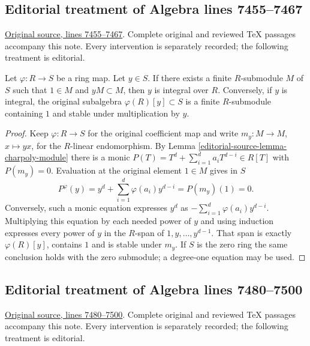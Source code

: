 \subsection{Editorial treatment of Algebra lines 7455--7467}

\hypertarget{algebra-context-069}{}

\noindent\href{https://github.com/stacks/stacks-project/blob/a04446e57ec1fbc252a871afcec7752fb2807b14/algebra.tex\#L7455}{Original source, lines 7455--7467}. Complete original and reviewed TeX passages accompany this note. Every intervention is separately recorded; the following treatment is editorial.


\begin{lemma}
\label{editorial-source-lemma-characterize-integral-element}
Let $\varphi : R \to S$ be a ring map. Let $y \in S$. If there exists a
finite $R$-submodule $M$ of $S$ such that $1 \in M$ and $yM \subset M$,
then $y$ is integral over $R$.
Conversely, if $y$ is integral, the original subalgebra
$\varphi(R)[y]\subset S$ is a finite $R$-submodule containing $1$
and stable under multiplication by $y$.
\end{lemma}

\begin{proof}
Keep $\varphi:R\to S$ for the original coefficient map and write
$m_y:M\to M$, $x\mapsto yx$, for the $R$-linear endomorphism.
By Lemma \ref{editorial-source-lemma-charpoly-module} there is a monic
$P(T)=T^d+\sum_{i=1}^d a_iT^{d-i}\in R[T]$ with $P(m_y)=0$.
Evaluation at the original element $1\in M$ gives in $S$
$$
P^\varphi(y)=y^d+\sum_{i=1}^d\varphi(a_i)y^{d-i}
=P(m_y)(1)=0.
$$
Conversely, such a monic equation expresses $y^d$ as
$-\sum_{i=1}^d\varphi(a_i)y^{d-i}$. Multiplying this equation by
each needed power of $y$ and using induction expresses every power
of $y$ in the $R$-span of $1,y,\ldots,y^{d-1}$.
That span is exactly $\varphi(R)[y]$, contains $1$ and is stable
under $m_y$. If $S$ is the zero ring the same conclusion holds with
the zero submodule; a degree-one equation may be used.
\end{proof}


\subsection{Editorial treatment of Algebra lines 7480--7500}

\hypertarget{algebra-context-070}{}

\noindent\href{https://github.com/stacks/stacks-project/blob/a04446e57ec1fbc252a871afcec7752fb2807b14/algebra.tex\#L7480}{Original source, lines 7480--7500}. Complete original and reviewed TeX passages accompany this note. Every intervention is separately recorded; the following treatment is editorial.


